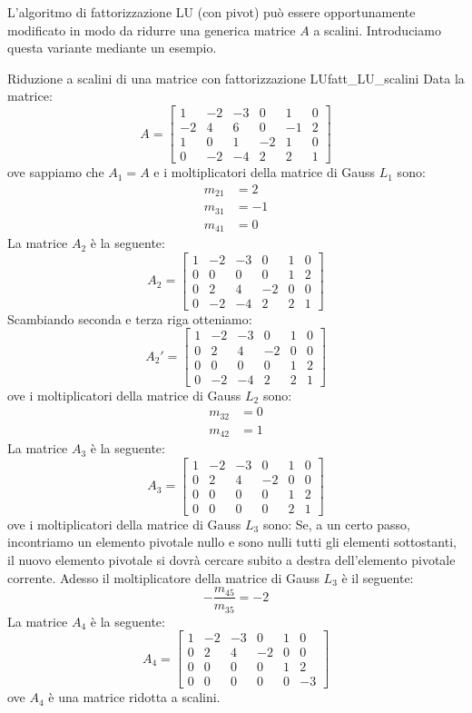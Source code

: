 \documentclass[12pt]{report}
\newcommand{\nmu}{}
\begin{document}
L'algoritmo di fattorizzazione LU (con pivot) può essere opportunamente modificato in modo da ridurre una generica matrice $A$ a scalini. Introduciamo questa variante mediante un esempio.
\begin{example}{\nmu Riduzione a scalini di una matrice con fattorizzazione LU}{fatt_LU_scalini}
Data la matrice:
\[
A = \begin{bmatrix}
	1 & -2 & -3 & 0 & 1 & 0 \\
	-2 & 4 & 6 & 0 & -1 & 2 \\
	1 & 0 & 1 & -2 & 1 & 0 \\
	0 & -2 & -4 & 2 & 2 & 1
\end{bmatrix}
\]
ove sappiamo che $A_1 = A$ e i moltiplicatori della matrice di Gauss $L_1$ sono:
\begin{align*}
	m_{21} &= 2 \\
	m_{31} &= -1 \\
	m_{41} &= 0
\end{align*}
La matrice $A_2$ è la seguente:
\[
A_2 = \begin{bmatrix}
	1 & -2 & -3 & 0 & 1 & 0 \\
	0 & 0 & 0 & 0 & 1 & 2 \\
	0 & 2 & 4 & -2 & 0 & 0 \\
	0 & -2 & -4 & 2 & 2 & 1
\end{bmatrix}
\]
Scambiando seconda e terza riga otteniamo:
\[
A_2' = \begin{bmatrix}
	1 & -2 & -3 & 0 & 1 & 0 \\
	0 & 2 & 4 & -2 & 0 & 0 \\
	0 & 0 & 0 & 0 & 1 & 2 \\
	0 & -2 & -4 & 2 & 2 & 1
\end{bmatrix}
\]
ove i moltiplicatori della matrice di Gauss $L_2$ sono:
\begin{align*}
m_{32} &= 0 \\
m_{42} &= 1
\end{align*}
La matrice $A_3$ è la seguente:
\[
A_3 = \begin{bmatrix}
	1 & -2 & -3 & 0 & 1 & 0 \\
	0 & 2 & 4 & -2 & 0 & 0 \\
	0 & 0 & 0 & 0 & 1 & 2 \\
	0 & 0 & 0 & 0 & 2 & 1
\end{bmatrix}
\]
ove i moltiplicatori della matrice di Gauss $L_3$ sono:
Se, a un certo passo, incontriamo un elemento pivotale nullo e sono nulli tutti gli elementi sottostanti, il nuovo elemento pivotale si dovrà cercare subito a destra dell'elemento pivotale corrente. Adesso il moltiplicatore della matrice di Gauss $L_3$ è il seguente:
\[
-\dfrac{m_{45}}{m_{35}} = -2
\]
La matrice $A_4$ è la seguente:
\[
A_4 = \begin{bmatrix}
	1 & -2 & -3 & 0 & 1 & 0 \\
	0 & 2 & 4 & -2 & 0 & 0 \\
	0 & 0 & 0 & 0 & 1 & 2 \\
	0 & 0 & 0 & 0 & 0 & -3
\end{bmatrix}
\]
ove $A_4$ è una matrice ridotta a scalini.
\end{example}
\end{document}
